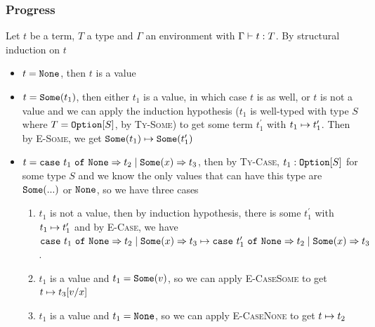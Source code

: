 \documentclass{article}
\newcommand{\tyoption}[1]{\ensuremath\mathtt{Option}[#1]}
\newcommand{\some}[1]{\ensuremath\mathtt{Some}(#1)}
\newcommand{\none}{\ensuremath\mathtt{None}}
\newcommand{\somecase}[4]{\ensuremath\mathtt{case}\ #1\ \mathtt{of}\ \none \Rightarrow #2 \mid \some{#3} \Rightarrow #4}
\newcommand{\typeinf}[3]{\ensuremath#1\vdash#2:#3}
\newcommand{\eval}[2]{\ensuremath#1\mapsto#2}
\newcommand{\subst}[3]{\ensuremath #1[#2/#3]}
\begin{document}
\subsubsection{Progress}
Let $t$ be a term, $T$ a type and $\Gamma$ an environment with $\typeinf{\Gamma}{t}{T}$.
By structural induction on $t$
\begin{itemize}
\item $t = \none$, then $t$ is a value
\item $t=\some{t_1}$, then either $t_1$ is a value, in which case $t$ is as well, or $t$ is not a value and we can apply the induction hypothesis 
($t_1$ is well-typed with type $S$ where $T=\tyoption{S}$, by \textsc{Ty-Some}) 
to get some term $t_1^{\prime}$ with $\eval{t_1}{t_1^{\prime}}$. 
Then by \textsc{E-Some}, we get $\eval{\some{t_1}}{\some{t_1^{\prime}}}$
\item $t=\somecase{t_1}{t_2}{x}{t_3}$, then by \textsc{Ty-Case}, $t_1:\tyoption{S}$ for some type $S$ and we know the only values that can have this type are $\some{...}$ or $\none$, so we have three cases
\begin{enumerate}
\item $t_1$ is not a value, then by induction hypothesis, there is some $t_1^{\prime}$ with $\eval{t_1}{t_1^{\prime}}$ and by \textsc{E-Case}, we have $\eval{\somecase{t_1}{t_2}{x}{t_3}}{\somecase{t_1^{\prime}}{t_2}{x}{t_3}}$.
\item $t_1$ is a value and $t_1 = \some{v}$, so we can apply \textsc{E-CaseSome} to get $\eval{t}{\subst{t_3}{v}{x}}$
\item $t_1$ is a value and $t_1 = \none$, so we can apply \textsc{E-CaseNone} to get $\eval{t}{t_2}$
\end{enumerate}
\end{itemize}
\end{document}
